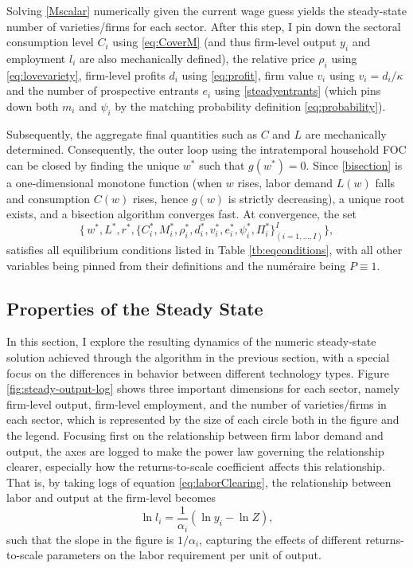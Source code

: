 \documentclass[a4paper,12pt]{article} %
\numberwithin{equation}{section} %
\numberwithin{figure}{section}
\numberwithin{table}{section}
\begin{document}
Solving \eqref{Mscalar} numerically given the current wage guess yields the
steady-state number of varieties/firms for each sector. After this step, I pin down the sectoral consumption level $C_i$ using 
\eqref{eq:CoverM} (and thus firm-level output $y_i$ and employment $l_i$ are also mechanically defined), the relative 
price $\rho_i$ using \eqref{eq:lovevariety}, firm-level profits $d_i$ using \eqref{eq:profit}, firm value $v_i$ using 
$v_i = d_i/\kappa$ and the number of prospective entrants $e_i$ using \eqref{steadyentrants} (which pins down both $m_i$
and $\psi_i$ by the matching probability definition \eqref{eq:probability}).

Subsequently, the aggregate final quantities such as $C$ and $L$ are mechanically determined. Consequently, the outer loop
using the intratemporal household FOC can be closed by finding the unique $w^*$ such that $g(w^*)= 0$. Since \eqref{bisection} is a 
one-dimensional monotone function (when $w$ rises, labor demand $L(w)$ falls and consumption $C(w)$ rises, 
hence $g(w)$ is strictly decreasing), a unique root exists, and a bisection algorithm converges fast. At convergence, the set
\[
\bigl\{\,w^*,L^*,r^*,\bigl\{
        C_i^*,M_i^*,\rho_i^*,d_i^*,v_i^*,e_i^*, \psi_i^*,\Pi_i^*\bigr\}^I_{(i=1,\dots,I)}\bigr\},
\]
satisfies all equilibrium conditions listed in Table \ref{tb:eqconditions}, with all other variables being 
pinned from their definitions and the numéraire being $P \equiv 1$.


\subsection{Properties of the Steady State}
\label{sec:solution-properties}

In this section, I explore the resulting dynamics of the numeric steady-state solution achieved through the 
algorithm in the previous section, with a special focus on the differences in behavior between different technology types.
Figure \ref{fig:steady-output-log} shows three important dimensions for each sector, namely firm-level output, firm-level 
employment, and the number 
of varieties/firms in each sector, which is represented by the size of each circle both in the figure and the legend.
Focusing first on the relationship between firm labor demand and output, the axes are logged to make the power law governing the relationship 
clearer, especially how the returns-to-scale coefficient affects this relationship. That is, by taking logs of equation 
\eqref{eq:laborClearing}, the relationship between labor and output at the firm-level becomes
\begin{equation}
  \ln l_i = \frac{1}{\alpha_i}(\ln y_i - \ln Z), \label{eq:laboroutputlog}
\end{equation}
such that the slope in the figure is $1/\alpha_i$, capturing the effects of different returns-to-scale parameters on the labor requirement
per unit of output. 
\end{document}
